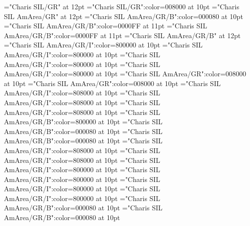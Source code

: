 \documentclass[a4paper,twoside]{article}
\begin{document}
\pagestyle{plain}
\sloppy
\setlength{\parfillskip}{0pt plus 1fil}
\font\dives="Charis SIL/GR" at 12pt
\font\spanes="Charis SIL/GR":color=008000 at 10pt
\font\divmxb="Charis SIL AmArea/GR" at 12pt
\font\spanmxb="Charis SIL AmArea/GR/B":color=000080 at 10pt
\font\spanmxbmainheadwordentry="Charis SIL AmArea/GR/B":color=0000FF at 11pt
\font\spanmainheadwordentry="Charis SIL AmArea/GR/B":color=0000FF at 11pt
\font\sensenumbersensecontentsensesentry="Charis SIL AmArea/GR/B" at 12pt
\font\spanespartofspeechmorphosyntaxanalysissharedgrammaticalinfosensesentry="Charis SIL AmArea/GR/I":color=800000 at 10pt
\font\spanpartofspeechmorphosyntaxanalysissharedgrammaticalinfosensesentry="Charis SIL AmArea/GR/I":color=800000 at 10pt
\font\spanespartofspeechmorphosyntaxanalysissensesensecontentsensesentry="Charis SIL AmArea/GR/I":color=800000 at 10pt
\font\spanpartofspeechmorphosyntaxanalysissensesensecontentsensesentry="Charis SIL AmArea/GR/I":color=800000 at 10pt
\font\spanesdefinitionsensesensecontentsensesentry="Charis SIL AmArea/GR":color=008000 at 10pt
\font\spandefinitionsensesensecontentsensesentry="Charis SIL AmArea/GR":color=008000 at 10pt
\font\comentariorestrictivosensesensecontentsensesentry="Charis SIL AmArea/GR/I":color=808000 at 10pt
\font{}="Charis SIL AmArea/GR/I":color=808000 at 10pt
\font\scientificnamesensesensecontentsensesentry="Charis SIL AmArea/GR/I":color=808000 at 10pt
\font\sensenumbersensecontentsensessensesensecontentsensesentry="Charis SIL AmArea/GR/B":color=800000 at 10pt
\font\spanmxbexampleexamplescontentssensesensecontentsensesentry="Charis SIL AmArea/GR/B":color=000080 at 10pt
\font\spanexampleexamplescontentssensesensecontentsensesentry="Charis SIL AmArea/GR/B":color=000080 at 10pt
\font\spanesencyclopedicinfosensesensecontentsensesentry="Charis SIL AmArea/GR/I":color=808000 at 10pt
\font\spanencyclopedicinfosensesensecontentsensesentry="Charis SIL AmArea/GR/I":color=808000 at 10pt
\font\spanescommententry="Charis SIL AmArea/GR/I":color=800000 at 10pt
\font\spancommententry="Charis SIL AmArea/GR/I":color=800000 at 10pt
\font\spanesabbreviationvariantentrytypevariantentrytypesvariantformentrybackrefsentry="Charis SIL AmArea/GR/I":color=800000 at 10pt
\font\spanabbreviationvariantentrytypevariantentrytypesvariantformentrybackrefsentry="Charis SIL AmArea/GR/I":color=800000 at 10pt
\font\spanmxbheadwordvariantformentrybackrefvariantformentrybackrefsentry="Charis SIL AmArea/GR/B":color=000080 at 10pt
\font\spanheadwordvariantformentrybackrefvariantformentrybackrefsentry="Charis SIL AmArea/GR/B":color=000080 at 10pt
\end{document}
